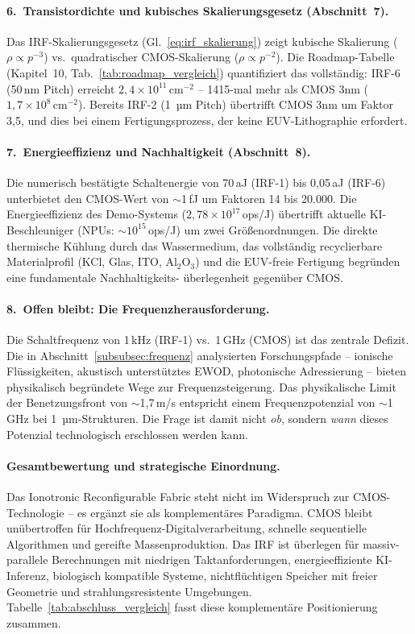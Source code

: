 ﻿\documentclass[a4paper,12pt]{scrreprt}
\theoremstyle{definition}
\begin{document}
\paragraph{6.~Transistordichte und kubisches Skalierungsgesetz (Abschnitt~7).}
Das IRF-Skalierungsgesetz (Gl.~\ref{eq:irf_skalierung}) zeigt
kubische Skalierung ($\rho \propto p^{-3}$) vs.\ quadratischer
CMOS-Skalierung ($\rho \propto p^{-2}$). Die Roadmap-Tabelle
(Kapitel~10, Tab.~\ref{tab:roadmap_vergleich}) quantifiziert das
vollständig: IRF-6 (50\,nm Pitch) erreicht $2{,}4 \times 10^{11}$\,cm$^{-2}$ --
1415-mal mehr als CMOS 3nm ($1{,}7 \times 10^8$\,cm$^{-2}$). Bereits
IRF-2 (1\, µm Pitch) übertrifft CMOS 3nm um Faktor 3,5, und dies
bei einem Fertigungsprozess, der keine EUV-Lithographie erfordert.

\paragraph{7.~Energieeffizienz und Nachhaltigkeit (Abschnitt~8).}
Die numerisch bestätigte Schaltenergie von 70\,aJ (IRF-1) bis
0,05\,aJ (IRF-6) unterbietet den CMOS-Wert von $\sim$1\,fJ
um Faktoren 14 bis 20.000. Die Energieeffizienz des Demo-Systems
($2{,}78 \times 10^{17}$\,ops/J) übertrifft aktuelle KI-Beschleuniger
(NPUs: $\sim 10^{15}$\,ops/J) um zwei Größenordnungen. Die direkte
thermische Kühlung durch das Wassermedium, das vollständig
recyclierbare Materialprofil (KCl, Glas, ITO, Al$_2$O$_3$) und
die EUV-freie Fertigung begründen eine fundamentale Nachhaltigkeits-
überlegenheit gegenüber CMOS.

\paragraph{8.~Offen bleibt: Die Frequenzherausforderung.}
Die Schaltfrequenz von 1\,kHz (IRF-1) vs.\ 1\,GHz (CMOS) ist
das zentrale Defizit. Die in Abschnitt~\ref{subsubsec:frequenz}
analysierten Forschungspfade -- ionische Flüssigkeiten, akustisch
unterstütztes EWOD, photonische Adressierung -- bieten physikalisch
begründete Wege zur Frequenzsteigerung. Das physikalische Limit der
Benetzungsfront von $\sim$1,7\,m/s entspricht einem Frequenzpotenzial
von $\sim$1\,GHz bei 1\, µm-Strukturen. Die Frage ist damit nicht
\emph{ob}, sondern \emph{wann} dieses Potenzial technologisch
erschlossen werden kann.

\paragraph{Gesamtbewertung und strategische Einordnung.}
Das Ionotronic Reconfigurable Fabric steht nicht im Widerspruch
zur CMOS-Technologie -- es ergänzt sie als komplementäres Paradigma.
CMOS bleibt unübertroffen für Hochfrequenz-Digitalverarbeitung,
schnelle sequentielle Algorithmen und gereifte Massenproduktion.
Das IRF ist überlegen für massiv-parallele Berechnungen mit niedrigen
Taktanforderungen, energieeffiziente KI-Inferenz, biologisch
kompatible Systeme, nichtflüchtigen Speicher mit freier
Geometrie und strahlungsresistente Umgebungen. Tabelle~\ref{tab:abschluss_vergleich}
fasst diese komplementäre Positionierung zusammen.
\end{document}
